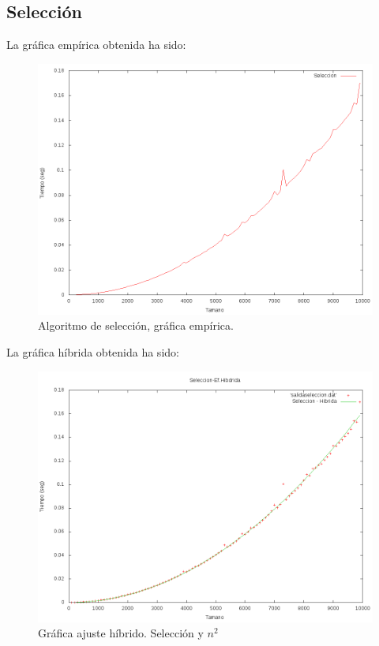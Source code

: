 \subsection{Selección}


La gráfica empírica obtenida ha sido:
\begin{figure}[H]
	\centering
	\includegraphics[scale=0.5]{imagenes/seleccionLines.png}
	\caption{Algoritmo de selección, gráfica empírica. }
	\label{fig:E4}
\end{figure}




La gráfica híbrida obtenida ha sido:
\begin{figure}[H]
	\centering
	\includegraphics[scale=0.5]{imagenes/seleccion-hibrida.png}
	\caption{Gráfica ajuste híbrido. Selección y $n^2$}
	\label{fig:E5}
\end{figure}


